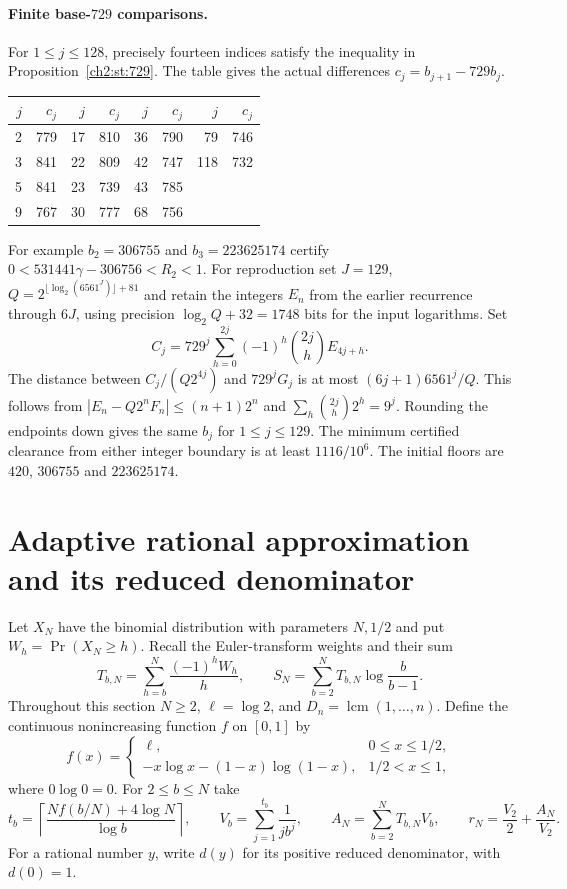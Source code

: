 \documentclass[11pt,a4paper,oneside,openany]{report}
\theoremstyle{remark}\newtheorem{remark}[theorem]{Remark}
\numberwithin{equation}{section}
\begin{document}
\paragraph{Finite base-$729$ comparisons.}
For $1\le j\le128$, precisely fourteen indices satisfy the inequality in Proposition~\ref{ch2:st:729}. The table gives the actual differences $c_j=b_{j+1}-729b_j$.
\begin{center}\small
\begin{tabular}{r r@{\qquad}r r@{\qquad}r r@{\qquad}r r}
\toprule $j$&$c_j$&$j$&$c_j$&$j$&$c_j$&$j$&$c_j$\\\midrule
2&779&17&810&36&790&79&746\\
3&841&22&809&42&747&118&732\\
5&841&23&739&43&785&&\\
9&767&30&777&68&756&&\\\bottomrule
\end{tabular}
\end{center}
For example $b_2=306755$ and $b_3=223625174$ certify $0<531441\gamma-306756<R_2<1$.
For reproduction set $J=129$, $Q=2^{\lfloor\log_2(6561^J)\rfloor+81}$ and retain the integers $E_n$ from the earlier recurrence through $6J$, using precision $\log_2Q+32=1748$ bits for the input logarithms. Set
\[
 C_j=729^j\sum_{h=0}^{2j}(-1)^h\binom{2j}{h}E_{4j+h}.
\]
The distance between $C_j/(Q2^{4j})$ and $729^jG_j$ is at most $(6j+1)6561^j/Q$. This follows from $|E_n-Q2^nF_n|\le(n+1)2^n$ and $\sum_h\binom{2j}{h}2^h=9^j$. Rounding the endpoints down gives the same $b_j$ for $1\le j\le129$. The minimum certified clearance from either integer boundary is at least $1116/10^6$. The initial floors are $420$, $306755$ and $223625174$.
\section{Adaptive rational approximation and its reduced denominator}
\label{ch2:st:adaptive}

Let $X_N$ have the binomial distribution with parameters $N,1/2$ and put
$W_h=\Pr(X_N\ge h)$. Recall the Euler-transform weights and their sum
\[
 T_{b,N}=\sum_{h=b}^N\frac{(-1)^h W_h}{h},\qquad
 S_N=\sum_{b=2}^N T_{b,N}\log\frac b{b-1}.
\]
Throughout this section $N\ge2$, $\ell=\log2$, and
$D_n=\operatorname{lcm}(1,\ldots,n)$. Define the continuous
nonincreasing function $f$ on $[0,1]$ by
\[
 f(x)=\begin{cases}
 \ell,&0\le x\le1/2,\\
 -x\log x-(1-x)\log(1-x),&1/2<x\le1 ,
 \end{cases}
\]
where $0\log 0=0$. For $2\le b\le N$ take
\[
 t_b=\left\lceil\frac{Nf(b/N)+4\log N}{\log b}\right\rceil,
 \qquad V_b=\sum_{j=1}^{t_b}\frac{1}{j b^j},\qquad
 A_N=\sum_{b=2}^N T_{b,N}V_b,\qquad
 r_N=\frac{V_2}{2}+\frac{A_N}{V_2}.
\]
For a rational number $y$, write $d(y)$ for its positive reduced
denominator, with $d(0)=1$.
\end{document}
